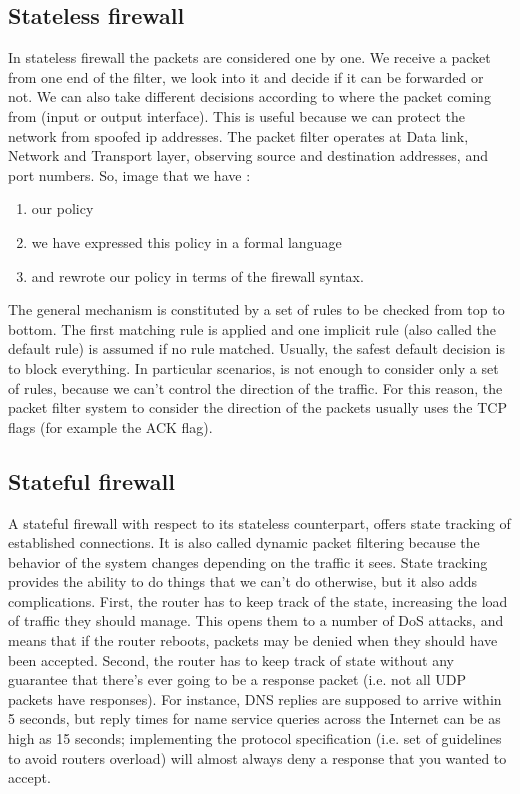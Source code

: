\documentclass[11pt]{article}
\begin{document}
\subsection{Stateless firewall}
In stateless firewall the packets are considered one by one. We receive a packet from one end of the filter, we look into it and decide if it can be forwarded or not. We can also take different decisions according to where the packet coming from (input or output interface). This is useful because we can protect the network from spoofed ip addresses. The packet filter operates at Data link, Network and Transport layer, observing source and destination addresses, and port numbers. So, image that we have :
\begin{enumerate}
\item our policy
\item we have expressed this policy in a formal language
\item and rewrote our policy in terms of the firewall syntax.
\end{enumerate}
The general mechanism is constituted by a set of rules to be checked from top to bottom. The first matching rule is applied and one implicit rule (also called the default rule) is assumed if no rule matched. Usually, the safest default decision is to block everything. In particular scenarios, is not enough to consider only a set of rules, because we can't control the direction of the traffic. For this reason, the packet filter system to consider the direction of the packets usually uses the TCP flags (for example the ACK flag).
\subsection{Stateful firewall}
A stateful firewall with respect to its stateless counterpart, offers state tracking of established connections. It is also called dynamic packet filtering because the behavior of the system changes depending on the traffic it sees. State tracking provides the ability to do things that we can't do otherwise, but it also adds complications. First, the router has to keep track of the state, increasing the load of traffic they should manage. This opens them to a number of DoS attacks, and means that if the router reboots, packets may be denied when they should have been accepted. Second, the router has to keep track of state without any guarantee that there's ever going to be a response packet (i.e. not all UDP packets have responses). For instance, DNS replies are supposed to arrive within 5 seconds, but reply times for name service queries across the Internet can be as high as 15 seconds; implementing the protocol specification (i.e. set of guidelines to avoid routers overload) will almost always deny a response that you wanted to accept.
\end{document}
